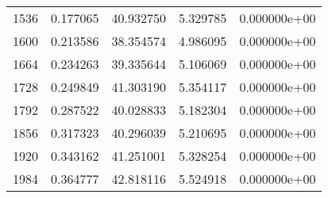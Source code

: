 \documentclass[12pt,letterpaper]{article}
\begin{document}
\begin{tabular}{ |c|c|c|c|c| }
      1536  & 0.177065 & 40.932750 &  5.329785 & 0.000000e+00 \\
      1600  & 0.213586 & 38.354574 &  4.986095 & 0.000000e+00 \\
      1664  & 0.234263 & 39.335644 &  5.106069 & 0.000000e+00 \\
      1728  & 0.249849 & 41.303190 &  5.354117 & 0.000000e+00 \\
      1792  & 0.287522 & 40.028833 &  5.182304 & 0.000000e+00 \\
      1856  & 0.317323 & 40.296039 &  5.210695 & 0.000000e+00 \\
      1920  & 0.343162 & 41.251001 &  5.328254 & 0.000000e+00 \\
      1984  & 0.364777 & 42.818116 &  5.524918 & 0.000000e+00 \\
 
\hline
\end{tabular}
  

\newpage
  
\end{document}
